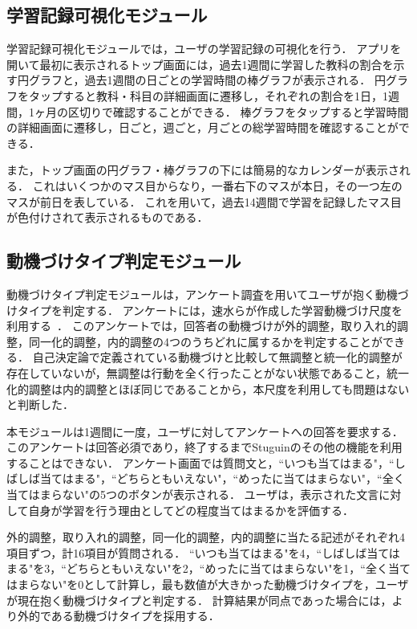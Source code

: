 \subsection{学習記録可視化モジュール}
学習記録可視化モジュールでは，ユーザの学習記録の可視化を行う．
アプリを開いて最初に表示されるトップ画面には，過去1週間に学習した教科の割合を示す円グラフと，過去1週間の日ごとの学習時間の棒グラフが表示される．
円グラフをタップすると教科・科目の詳細画面に遷移し，それぞれの割合を1日，1週間，1ヶ月の区切りで確認することができる．
棒グラフをタップすると学習時間の詳細画面に遷移し，日ごと，週ごと，月ごとの総学習時間を確認することができる．

また，トップ画面の円グラフ・棒グラフの下には簡易的なカレンダーが表示される．
これはいくつかのマス目からなり，一番右下のマスが本日，その一つ左のマスが前日を表している．
これを用いて，過去14週間で学習を記録したマス目が色付けされて表示されるものである．

\subsection{動機づけタイプ判定モジュール}
動機づけタイプ判定モジュールは，アンケート調査を用いてユーザが抱く動機づけタイプを判定する．
アンケートには，速水らが作成した学習動機づけ尺度を利用する~\cite{hayamizu}．
このアンケートでは，回答者の動機づけが外的調整，取り入れ的調整，同一化的調整，内的調整の4つのうちどれに属するかを判定することができる．
自己決定論で定義されている動機づけと比較して無調整と統一化的調整が存在していないが，無調整は行動を全く行ったことがない状態であること，統一化的調整は内的調整とほぼ同じであることから，本尺度を利用しても問題はないと判断した．

本モジュールは1週間に一度，ユーザに対してアンケートへの回答を要求する．
このアンケートは回答必須であり，終了するまでStuguinのその他の機能を利用することはできない．
アンケート画面では質問文と，``いつも当てはまる"，``しばしば当てはまる"，``どちらともいえない"，``めったに当てはまらない"，``全く当てはまらない"の5つのボタンが表示される．
ユーザは，表示された文言に対して自身が学習を行う理由としてどの程度当てはまるかを評価する．

外的調整，取り入れ的調整，同一化的調整，内的調整に当たる記述がそれぞれ4項目ずつ，計16項目が質問される．
``いつも当てはまる"を4，``しばしば当てはまる"を3，``どちらともいえない"を2，``めったに当てはまらない"を1，``全く当てはまらない"を0として計算し，最も数値が大きかった動機づけタイプを，ユーザが現在抱く動機づけタイプと判定する．
計算結果が同点であった場合には，より外的である動機づけタイプを採用する．

